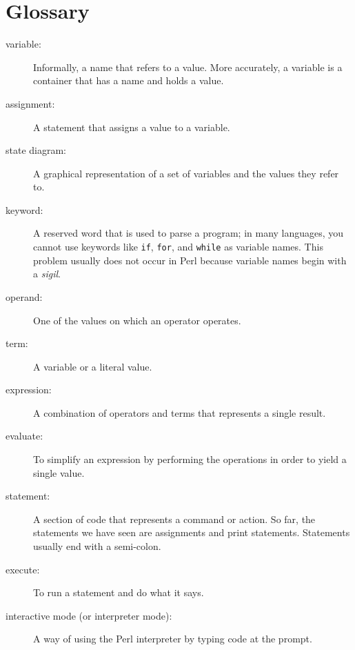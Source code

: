 \section{Glossary}

\begin{description}

\item[variable:]  Informally, a name that refers to a value. More 
accurately, a variable is a container that has a name and holds a value.

\item[assignment:]  A statement that assigns a value to a variable.

\item[state diagram:]  A graphical representation of a set of variables and the
values they refer to.

\item[keyword:]  A reserved word that is used to parse a
program; in many languages, you cannot use keywords like 
{\tt if}, {\tt  for}, and {\tt while} as variable names. 
This problem usually does not occur in Perl because variable
names begin with a \emph{sigil}.

\item[operand:]  One of the values on which an operator operates.

\item[term:]  A variable or a literal value.

\item[expression:]  A combination of operators and terms that
represents a single result.

\item[evaluate:]  To simplify an expression by performing the operations
in order to yield a single value.

\item[statement:]  A section of code that represents a command or action.  So
far, the statements we have seen are assignments and print statements. Statements usually end with a semi-colon.

\item[execute:]  To run a statement and do what it says.

\item[interactive mode (or interpreter mode):] A way of using the Perl 
interpreter by typing code at the prompt.


\end{description}
